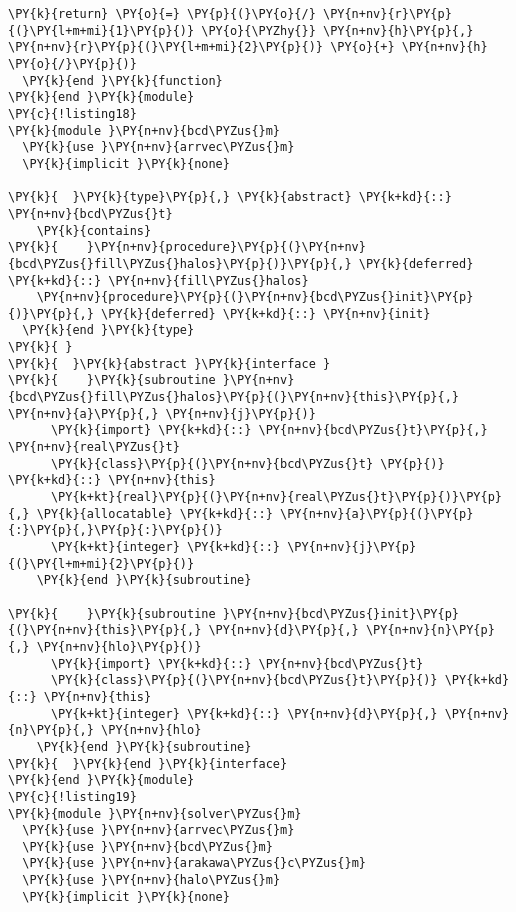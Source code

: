 \begin{Verbatim}[commandchars=\\\{\}]
    \PY{k}{return} \PY{o}{=} \PY{p}{(}\PY{o}{/} \PY{n+nv}{r}\PY{p}{(}\PY{l+m+mi}{1}\PY{p}{)} \PY{o}{\PYZhy{}} \PY{n+nv}{h}\PY{p}{,} \PY{n+nv}{r}\PY{p}{(}\PY{l+m+mi}{2}\PY{p}{)} \PY{o}{+} \PY{n+nv}{h} \PY{o}{/}\PY{p}{)}
  \PY{k}{end }\PY{k}{function}
\PY{k}{end }\PY{k}{module}
\PY{c}{!listing18}
\PY{k}{module }\PY{n+nv}{bcd\PYZus{}m}
  \PY{k}{use }\PY{n+nv}{arrvec\PYZus{}m}
  \PY{k}{implicit }\PY{k}{none}

\PY{k}{  }\PY{k}{type}\PY{p}{,} \PY{k}{abstract} \PY{k+kd}{::} \PY{n+nv}{bcd\PYZus{}t}
    \PY{k}{contains}
\PY{k}{    }\PY{n+nv}{procedure}\PY{p}{(}\PY{n+nv}{bcd\PYZus{}fill\PYZus{}halos}\PY{p}{)}\PY{p}{,} \PY{k}{deferred} \PY{k+kd}{::} \PY{n+nv}{fill\PYZus{}halos}
    \PY{n+nv}{procedure}\PY{p}{(}\PY{n+nv}{bcd\PYZus{}init}\PY{p}{)}\PY{p}{,} \PY{k}{deferred} \PY{k+kd}{::} \PY{n+nv}{init}
  \PY{k}{end }\PY{k}{type}
\PY{k}{ }
\PY{k}{  }\PY{k}{abstract }\PY{k}{interface }
\PY{k}{    }\PY{k}{subroutine }\PY{n+nv}{bcd\PYZus{}fill\PYZus{}halos}\PY{p}{(}\PY{n+nv}{this}\PY{p}{,} \PY{n+nv}{a}\PY{p}{,} \PY{n+nv}{j}\PY{p}{)}
      \PY{k}{import} \PY{k+kd}{::} \PY{n+nv}{bcd\PYZus{}t}\PY{p}{,} \PY{n+nv}{real\PYZus{}t}
      \PY{k}{class}\PY{p}{(}\PY{n+nv}{bcd\PYZus{}t} \PY{p}{)} \PY{k+kd}{::} \PY{n+nv}{this}
      \PY{k+kt}{real}\PY{p}{(}\PY{n+nv}{real\PYZus{}t}\PY{p}{)}\PY{p}{,} \PY{k}{allocatable} \PY{k+kd}{::} \PY{n+nv}{a}\PY{p}{(}\PY{p}{:}\PY{p}{,}\PY{p}{:}\PY{p}{)} 
      \PY{k+kt}{integer} \PY{k+kd}{::} \PY{n+nv}{j}\PY{p}{(}\PY{l+m+mi}{2}\PY{p}{)}
    \PY{k}{end }\PY{k}{subroutine}

\PY{k}{    }\PY{k}{subroutine }\PY{n+nv}{bcd\PYZus{}init}\PY{p}{(}\PY{n+nv}{this}\PY{p}{,} \PY{n+nv}{d}\PY{p}{,} \PY{n+nv}{n}\PY{p}{,} \PY{n+nv}{hlo}\PY{p}{)}
      \PY{k}{import} \PY{k+kd}{::} \PY{n+nv}{bcd\PYZus{}t}
      \PY{k}{class}\PY{p}{(}\PY{n+nv}{bcd\PYZus{}t}\PY{p}{)} \PY{k+kd}{::} \PY{n+nv}{this}
      \PY{k+kt}{integer} \PY{k+kd}{::} \PY{n+nv}{d}\PY{p}{,} \PY{n+nv}{n}\PY{p}{,} \PY{n+nv}{hlo}
    \PY{k}{end }\PY{k}{subroutine}
\PY{k}{  }\PY{k}{end }\PY{k}{interface}
\PY{k}{end }\PY{k}{module}
\PY{c}{!listing19}
\PY{k}{module }\PY{n+nv}{solver\PYZus{}m}
  \PY{k}{use }\PY{n+nv}{arrvec\PYZus{}m}
  \PY{k}{use }\PY{n+nv}{bcd\PYZus{}m}
  \PY{k}{use }\PY{n+nv}{arakawa\PYZus{}c\PYZus{}m}
  \PY{k}{use }\PY{n+nv}{halo\PYZus{}m}
  \PY{k}{implicit }\PY{k}{none}


\end{Verbatim}
